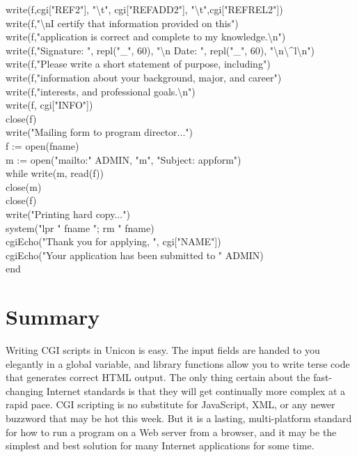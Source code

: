 {\>write(f,cgi["REF2"], "{\textbackslash}t", cgi["REFADD2"], "{\textbackslash}t",cgi["REFREL2"]) \\
\>write(f,"{\textbackslash}nI certify that information provided on this") \\
\>write(f,"application is correct and complete to my knowledge.{\textbackslash}n") \\
\>write(f,"Signature: ", repl("\_", 60), "{\textbackslash}n Date: ", repl("\_", 60),
"{\textbackslash}n{\textbackslash}\^{}l{\textbackslash}n") \\
\>write(f,"Please write a short statement of purpose, including") \\
\>write(f,"information about your background, major, and career") \\
\>write(f,"interests, and professional goals.{\textbackslash}n") \\
\>write(f, cgi["INFO"]) \\
\>close(f) \\
\>write("Mailing form to program director...") \\
\>f := open(fname) \\
\>m := open("mailto:" {\textbar}{\textbar} ADMIN, "m", "Subject: appform") \\
\>while write(m, read(f)) \\
\>close(m) \\
\>close(f) \\
\>write("Printing hard copy...") \\
\>system("lpr " {\textbar}{\textbar} fname {\textbar}{\textbar} "; rm " {\textbar}{\textbar} fname) \\
\>cgiEcho("Thank you for applying, ", cgi["NAME"]) \\
\>cgiEcho("Your application has been submitted to " {\textbar}{\textbar} ADMIN) \\
end
}

\section*{Summary}

Writing CGI scripts in Unicon is easy. The input fields are handed to
you elegantly in a global variable, and library functions allow you to
write terse code that generates correct HTML output. The only thing
certain about the fast-changing Internet standards is that they will
get continually more complex at a rapid pace. CGI scripting is no
substitute for JavaScript, XML, or any
newer buzzword that may be hot this week. But it is a lasting,
multi-platform standard for how to run a program on a Web server from a
browser, and it may be the simplest and best solution for many Internet
applications for some time.
